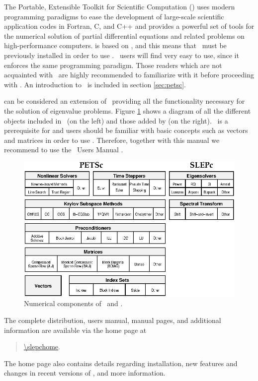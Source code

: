 	The Portable, Extensible Toolkit for Scientific Computation (\petsc) uses modern programming paradigms to ease the development of large-scale scientific application codes in Fortran, C, and C++ and provides a powerful set of tools for the numerical solution of partial differential equations and related problems on high-performance computers. \slepc is based on \petsc, and this means that \petsc\ must be previously installed in order to use \slepc. \petsc\ users will find \slepc very easy to use, since it enforces the same programming paradigm. Those readers which are not acquainted with \petsc\ are highly recommended to familiarize with it before proceeding with \slepc. An introduction to \petsc\ is included in section \ref{sec:petsc}.

	\slepc can be considered an extension of \petsc\ providing all the functionality necessary for the solution of eigenvalue problems. Figure \ref{fig:slepc} shows a diagram of all the different objects included in \petsc\ (on the left) and those added by \slepc (on the right). \petsc\ is a prerequisite for \slepc and users should be familiar with basic concepts such as vectors and matrices in order to use \slepc. Therefore, together with this manual we recommend to use the \petsc\ Users Manual \citep{Balay:2002:PUM}.

\begin{figure}[t]
\centering
\includegraphics[width=12cm]{slepc-fig.eps}
\caption{\label{fig:slepc}Numerical components of \petsc\ and \slepc.}
\end{figure}

The complete \slepc distribution, users manual, manual pages, and additional information are available via the \slepc home page at 
	\begin{quote}
	\begin{center}
	\url{\slepchome}.
	\end{center}
	\end{quote}
The \slepc home page also contains details regarding installation, new features and changes in recent versions of \slepc, and more information.


